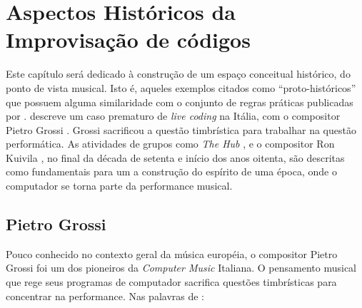 \chapter{Aspectos Históricos da Improvisação de códigos}\label{sec:protohistoria}

Este capítulo será dedicado à construção de um espaço conceitual histórico, do ponto de vista musical. Isto é, aqueles exemplos citados como ``proto-históricos'' que possuem alguma similaridade com o conjunto de regras práticas publicadas por  .  descreve um caso prematuro de \emph{live coding} na Itália, com o compositor Pietro Grossi . Grossi sacrificou a questão timbrística para trabalhar na questão performática. As atividades de grupos como \emph{The Hub} , e o compositor Ron Kuivila , no final da década de setenta e início dos anos oitenta, são descritas como fundamentais para um a construção do espírito de uma época, onde o computador se torna parte da performance musical.


\section{Pietro Grossi}\label{sec:grossi}

Pouco conhecido no contexto geral da música européia, o compositor Pietro Grossi foi  um dos pioneiros da \emph{Computer Music} Italiana. O pensamento musical que rege seus programas de computador sacrifica questões timbrísticas para concentrar na performance. Nas palavras de :

